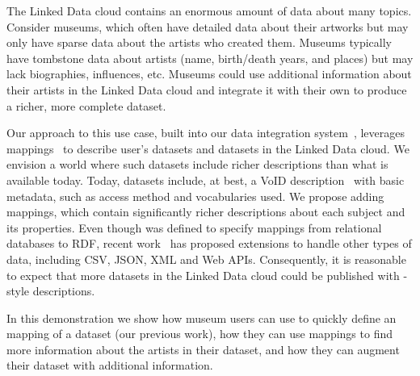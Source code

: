 The Linked Data cloud contains an enormous amount of data about many topics.
Consider museums, which often have detailed data about their artworks but may only have sparse data about the artists who created them.
Museums typically have tombstone data about artists (name, birth/death years, and places) but may lack biographies, influences, etc.
Museums could use additional information about their artists in the Linked Data cloud and integrate it with their own to produce a richer, more complete dataset.

Our approach to this use case, built into our \karma data integration system~\cite{Szekely:2013vq}, leverages \rtworml mappings~\cite{Sundara:12:RRR} to describe user's datasets and datasets in the Linked Data cloud.
We envision a world where such datasets include richer descriptions than what is available today.
Today, datasets include, at best, a VoID description~\cite{Alexander:11:DLD} with basic metadata, such as access method and vocabularies used.
We propose adding \rtworml mappings, which contain significantly richer descriptions about each subject and its properties.
Even though \rtworml was defined to specify mappings from relational databases to RDF, recent work~\cite{conf/semweb/DimouSCMW13} has proposed extensions to handle other types of data, including CSV, JSON, XML and Web APIs.
Consequently, it is reasonable to expect that more datasets in the Linked Data cloud could be published with \rtworml-style descriptions.

In this demonstration we show how museum users can use \karma to quickly define an \rtworml mapping of a dataset (our previous work), how they can use \rtworml mappings to find more information about the artists in their dataset, and how they can augment their dataset with additional information.